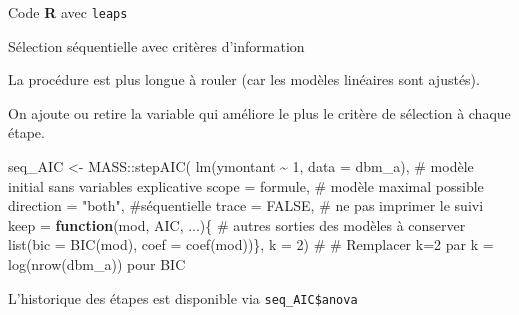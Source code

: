 \documentclass[
  ignorenonframetext,
]{beamer}
\newenvironment{Shaded}{\begin{snugshade}}{\end{snugshade}}
\newcommand{\AttributeTok}[1]{\textcolor[rgb]{0.40,0.45,0.13}{#1}}
\newcommand{\CommentTok}[1]{\textcolor[rgb]{0.37,0.37,0.37}{#1}}
\newcommand{\ConstantTok}[1]{\textcolor[rgb]{0.56,0.35,0.01}{#1}}
\newcommand{\ControlFlowTok}[1]{\textcolor[rgb]{0.00,0.23,0.31}{\textbf{#1}}}
\newcommand{\DecValTok}[1]{\textcolor[rgb]{0.68,0.00,0.00}{#1}}
\newcommand{\FunctionTok}[1]{\textcolor[rgb]{0.28,0.35,0.67}{#1}}
\newcommand{\NormalTok}[1]{\textcolor[rgb]{0.00,0.23,0.31}{#1}}
\newcommand{\OtherTok}[1]{\textcolor[rgb]{0.00,0.23,0.31}{#1}}
\newcommand{\SpecialCharTok}[1]{\textcolor[rgb]{0.37,0.37,0.37}{#1}}
\newcommand{\StringTok}[1]{\textcolor[rgb]{0.13,0.47,0.30}{#1}}
\begin{document}
\begin{frame}[fragile]{Code \textbf{R} avec \texttt{leaps}}
\label{code-r-avec-leaps}
\begin{Shaded}
\end{Shaded}
\end{frame}

\begin{frame}[fragile]{Sélection séquentielle avec critères
d'information}
\label{suxe9lection-suxe9quentielle-avec-crituxe8res-dinformation}
\footnotesize

La procédure est plus longue à rouler (car les modèles linéaires sont
ajustés).

On ajoute ou retire la variable qui améliore le plus le critère de
sélection à chaque étape.

\begin{Shaded}
\begin{Highlighting}[numbers=left,,]
\NormalTok{seq\_AIC }\OtherTok{\textless{}{-}}\NormalTok{ MASS}\SpecialCharTok{::}\FunctionTok{stepAIC}\NormalTok{(}
  \FunctionTok{lm}\NormalTok{(ymontant }\SpecialCharTok{\textasciitilde{}} \DecValTok{1}\NormalTok{, }\AttributeTok{data =}\NormalTok{ dbm\_a), }
  \CommentTok{\# modèle initial sans variables explicative}
    \AttributeTok{scope =}\NormalTok{ formule, }\CommentTok{\# modèle maximal possible}
    \AttributeTok{direction =} \StringTok{"both"}\NormalTok{, }\CommentTok{\#séquentielle}
    \AttributeTok{trace =} \ConstantTok{FALSE}\NormalTok{, }\CommentTok{\# ne pas imprimer le suivi}
    \AttributeTok{keep =} \ControlFlowTok{function}\NormalTok{(mod, AIC, ...)\{ }
      \CommentTok{\# autres sorties des modèles à conserver}
      \FunctionTok{list}\NormalTok{(}\AttributeTok{bic =} \FunctionTok{BIC}\NormalTok{(mod), }
           \AttributeTok{coef =} \FunctionTok{coef}\NormalTok{(mod))\},}
    \AttributeTok{k =} \DecValTok{2}\NormalTok{) }\CommentTok{\#}
\CommentTok{\# Remplacer k=2 par k = log(nrow(dbm\_a)) pour BIC}
\end{Highlighting}
\end{Shaded}

L'historique des étapes est disponible via \texttt{seq\_AIC\$anova}

\normalsize
\end{frame}
\end{document}
